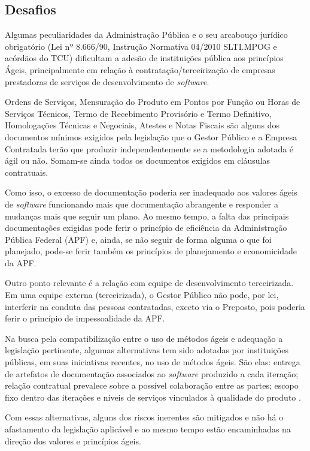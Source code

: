 \subsection[Desafios]{Desafios}

Algumas peculiaridades da Administração Pública e o seu arcabouço jurídico obrigatório (Lei nº 8.666/90, Instrução Normativa 04/2010 SLTI.MPOG e acórdãos do TCU) dificultam a adesão de instituições pública aos princípios Ágeis, principalmente em relação à contratação/terceirização de empresas prestadoras de serviços de desenvolvimento de \textit{software}.

Ordens de Serviços, Mensuração do Produto em Pontos por Função ou Horas de Serviços Técnicos, Termo de Recebimento Provisório e Termo Definitivo, Homologações Técnicas e Negociais, Atestes e Notas Fiscais são alguns dos documentos mínimos exigidos pela legislação que o Gestor Público e a Empresa Contratada terão que produzir independentemente se a metodologia adotada é ágil ou não. Somam-se ainda todos os documentos exigidos em cláusulas contratuais. 

Como isso, o excesso de documentação poderia ser inadequado aos valores ágeis de \textit{software} funcionando mais que documentação abrangente e responder a mudanças mais que seguir um plano. Ao mesmo tempo, a falta das principais documentações exigidas pode ferir o princípio de eficiência da Administração Pública Federal (APF) e, ainda, se não seguir de forma alguma o que foi  planejado, pode-se ferir também os princípios de planejamento e economicidade da APF. \cite{ruas}

Outro ponto relevante é a relação com equipe de desenvolvimento terceirizada. Em uma equipe externa (terceirizada), o Gestor Público não pode, por lei, interferir na conduta das pessoas contratadas, exceto via o Preposto, pois poderia ferir o princípio de impessoalidade da APF.

Na busca pela compatibilização entre o uso de métodos ágeis e adequação a legislação pertinente, algumas alternativas tem sido adotadas por instituições públicas, em suas iniciativas recentes, no uso de métodos ágeis. São elas: entrega de artefatos de documentação associados ao \textit{software} produzido a cada iteração; relação contratual prevalece sobre a possível colaboração entre as partes; escopo fixo dentro das iterações e níveis de serviços vinculados à qualidade do produto   \cite{ruas}. 

Com essas alternativas, alguns dos riscos inerentes são mitigados e não há o afastamento da legislação aplicável e ao mesmo tempo estão encaminhadas na direção dos valores e princípios ágeis. 


